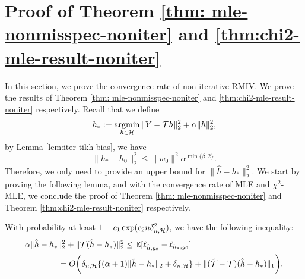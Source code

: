 \section{Proof of Theorem \ref{thm: mle-nonmisspec-noniter} and \ref{thm:chi2-mle-result-noniter}}\label{sec:proof-mle-nonmisspec-noniter}
In this section, we prove the convergence rate of non-iterative RMIV. We prove the results of Theorem \ref{thm: mle-nonmisspec-noniter} and \ref{thm:chi2-mle-result-noniter}\label{sec:proof-mle-nonmisspec-noniter} respectively. Recall that we define \begin{align}
h_{*} := \mathop{\mathrm{argmin}}_{h\in \mathcal{H}} \|Y-{\mathcal{T}} h \|_2^2 + \alpha \|h\|_2^2,
\end{align}
by Lemma \ref{lem:iter-tikh-bias}, we have $$
\|h_{*} - h_0\|_2^2 \leq \|w_0\|^2 \alpha^{\min\{\beta,2\}}.
$$
Therefore, we only need to provide an upper bound for $\|\hat{h} - h_{*}\|_2^2$. We start by proving the following lemma, and with the convergence rate of MLE and $\chi^2$-MLE, we conclude the proof of Theorem \ref{thm: mle-nonmisspec-noniter} and Theorem \ref{thm:chi2-mle-result-noniter} respectively. 
\begin{lemma}\label{lem: quadra-lemma}
With probability at least $1 - c_1\exp(c_2 n\delta_{n,\mathcal{H}}^2)$, we have the following inequality:
    \begin{align*}
    &\alpha \|\hat h - h_* \|^2_2 + \|{\mathcal{T}}(\hat h-h_*)\|^2_2 \leq \mathbb{E}[\ell_{\hat{h},g_0} -  \ell_{h_*,g_0}] \\
    &\qquad\qquad= O\bigg( \delta_{n,\mathcal{H}}\{ (\alpha+1) \|\hat h-h_*\|_2  +   \delta_{n,\mathcal{H}}   \}+  \|(\hat {{\mathcal{T}}}-{\mathcal{T}})(\hat h-h_*)\|_1\bigg).
    \end{align*}
\end{lemma}
